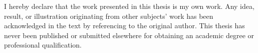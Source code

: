 
\begin{declaration}

I hereby declare that the work presented in this thesis is my own work. Any idea, result, or illustration originating from other subjects’ work has been acknowledged in the text by referencing to the original author. This thesis has never been published or submitted elsewhere for obtaining an academic degree or professional qualification. 


\end{declaration}

